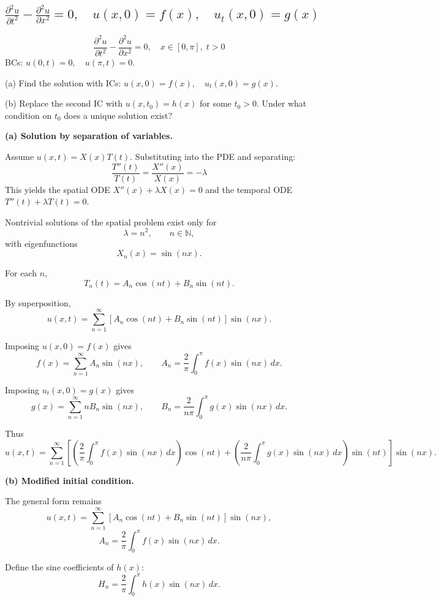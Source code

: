 \documentclass[a4paper,11pt]{article} %
\begin{document}
\subsection{$\frac{\partial^2 u}{\partial t^2}-\frac{\partial^2 u}{\partial x^2}=0,\quad u(x,0)=f(x),\quad u_t(x,0)=g(x)$}
\begin{problembox}
$$\frac{\partial^2 u}{\partial t^2}-\frac{\partial^2 u}{\partial x^2}=0, \quad x\in[0,\pi],\; t>0$$
BCs: $u(0,t)=0,\quad u(\pi,t)=0$.

(a) Find the solution with ICs: $u(x,0)=f(x),\quad u_t(x,0)=g(x)$.

(b) Replace the second IC with $u(x,t_0) = h(x)$ for some $t_0 > 0$. Under what condition on $t_0$ does a unique solution exist?
\end{problembox}

\textbf{(a) Solution by separation of variables.}

Assume $u(x,t)=X(x)T(t)$. Substituting into the PDE and separating:
$$\frac{T''(t)}{T(t)}=\frac{X''(x)}{X(x)}=-\lambda$$
This yields the spatial ODE $X''(x)+\lambda X(x)=0$ and the temporal ODE $T''(t)+\lambda T(t)=0$.

Nontrivial solutions of the spatial problem exist only for
\[
\lambda=n^2, \qquad n\in\mathbb{N},
\]
with eigenfunctions
\[
X_n(x)=\sin(nx).
\]

For each $n$,
\[
T_n(t)=A_n\cos(nt)+B_n\sin(nt).
\]

By superposition,
\[
u(x,t)=\sum_{n=1}^{\infty}
\left[A_n\cos(nt)+B_n\sin(nt)\right]\sin(nx).
\]

Imposing $u(x,0)=f(x)$ gives
\[
f(x)=\sum_{n=1}^{\infty}A_n\sin(nx),
\qquad
A_n=\frac{2}{\pi}\int_0^{\pi}f(x)\sin(nx)\,dx.
\]

Imposing $u_t(x,0)=g(x)$ gives
\[
g(x)=\sum_{n=1}^{\infty}nB_n\sin(nx),
\qquad
B_n=\frac{2}{n\pi}\int_0^{\pi}g(x)\sin(nx)\,dx.
\]

Thus
\[
u(x,t)=\sum_{n=1}^{\infty}
\left[
\left(\frac{2}{\pi}\int_0^{\pi}f(x)\sin(nx)\,dx\right)\cos(nt)
+
\left(\frac{2}{n\pi}\int_0^{\pi}g(x)\sin(nx)\,dx\right)\sin(nt)
\right]\sin(nx).
\]

\textbf{(b) Modified initial condition.}

The general form remains
\[
u(x,t)=\sum_{n=1}^{\infty}
\left[A_n\cos(nt)+B_n\sin(nt)\right]\sin(nx),
\]
\[
A_n=\frac{2}{\pi}\int_0^{\pi}f(x)\sin(nx)\,dx.
\]

Define the sine coefficients of $h(x)$:
\[
H_n=\frac{2}{\pi}\int_0^{\pi}h(x)\sin(nx)\,dx.
\]
\end{document}
